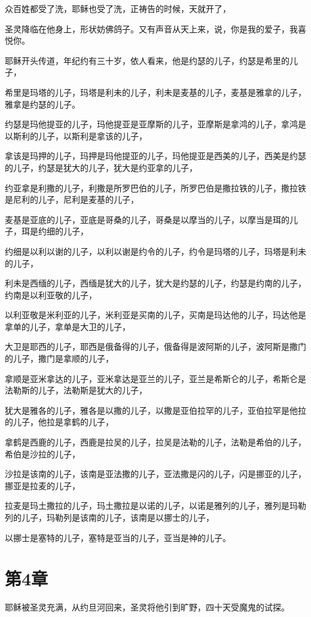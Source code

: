 \documentclass[12pt,oneside]{book}
\begin{document}
众百姓都受了洗，耶稣也受了洗，正祷告的时候，天就开了，

圣灵降临在他身上，形状妨佛鸽子。又有声音从天上来，说，你是我的爱子，我喜悦你。

耶稣开头传道，年纪约有三十岁，依人看来，他是约瑟的儿子，约瑟是希里的儿子，

希里是玛塔的儿子，玛塔是利未的儿子，利未是麦基的儿子，麦基是雅拿的儿子，雅拿是约瑟的儿子。

约瑟是玛他提亚的儿子，玛他提亚是亚摩斯的儿子，亚摩斯是拿鸿的儿子，拿鸿是以斯利的儿子，以斯利是拿该的儿子，

拿该是玛押的儿子，玛押是玛他提亚的儿子，玛他提亚是西美的儿子，西美是约瑟的儿子，约瑟是犹大的儿子，犹大是约亚拿的儿子，

约亚拿是利撒的儿子，利撒是所罗巴伯的儿子，所罗巴伯是撒拉铁的儿子，撒拉铁是尼利的儿子，尼利是麦基的儿子，

麦基是亚底的儿子，亚底是哥桑的儿子，哥桑是以摩当的儿子，以摩当是珥的儿子，珥是约细的儿子，

约细是以利以谢的儿子，以利以谢是约令的儿子，约令是玛塔的儿子，玛塔是利未的儿子，

利未是西缅的儿子，西缅是犹大的儿子，犹大是约瑟的儿子，约瑟是约南的儿子，约南是以利亚敬的儿子，

以利亚敬是米利亚的儿子，米利亚是买南的儿子，买南是玛达他的儿子，玛达他是拿单的儿子，拿单是大卫的儿子，

大卫是耶西的儿子，耶西是俄备得的儿子，俄备得是波阿斯的儿子，波阿斯是撒门的儿子，撒门是拿顺的儿子，

拿顺是亚米拿达的儿子，亚米拿达是亚兰的儿子，亚兰是希斯仑的儿子，希斯仑是法勒斯的儿子，法勒斯是犹大的儿子，

犹大是雅各的儿子，雅各是以撒的儿子，以撒是亚伯拉罕的儿子，亚伯拉罕是他拉的儿子，他拉是拿鹤的儿子，

拿鹤是西鹿的儿子，西鹿是拉吴的儿子，拉吴是法勒的儿子，法勒是希伯的儿子，希伯是沙拉的儿子，

沙拉是该南的儿子，该南是亚法撒的儿子，亚法撒是闪的儿子，闪是挪亚的儿子，挪亚是拉麦的儿子，

拉麦是玛土撒拉的儿子，玛土撒拉是以诺的儿子，以诺是雅列的儿子，雅列是玛勒列的儿子，玛勒列是该南的儿子，该南是以挪士的儿子，

以挪士是塞特的儿子，塞特是亚当的儿子，亚当是神的儿子。

\chapter{第4章}
耶稣被圣灵充满，从约旦河回来，圣灵将他引到旷野，四十天受魔鬼的试探。
\end{document}
